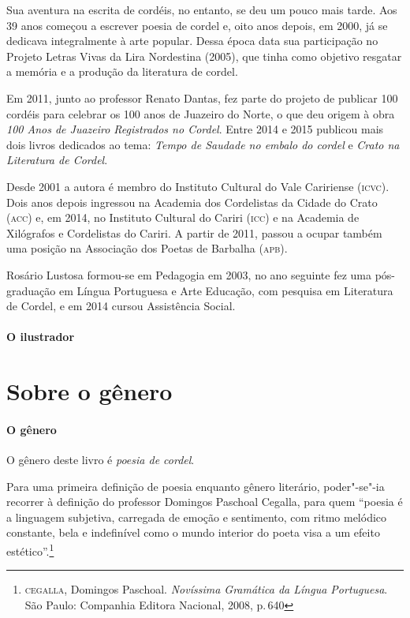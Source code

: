 \documentclass[11pt]{extarticle}
\begin{document}
Sua aventura na escrita de cordéis, no entanto, se deu um pouco mais tarde. Aos 39 anos começou a escrever poesia de cordel e, oito anos depois, em 2000, já se dedicava integralmente à arte popular. Dessa época data sua participação no Projeto Letras Vivas da Lira Nordestina (2005), que tinha como objetivo resgatar a memória e a produção da literatura de cordel.

Em 2011, junto ao professor Renato Dantas, fez parte do projeto de publicar 100 cordéis para celebrar os 100 anos de Juazeiro do Norte, o que deu origem à obra \textit{100 Anos de Juazeiro Registrados no Cordel}. Entre 2014 e 2015 publicou mais dois livros dedicados ao tema: \textit{Tempo de Saudade no embalo do cordel} e \textit{Crato na Literatura de Cordel}.

Desde 2001 a autora é membro do Instituto Cultural do Vale Caririense (\textsc{icvc}). Dois anos depois ingressou na Academia dos Cordelistas da Cidade do Crato (\textsc{acc}) e, em 2014, no Instituto Cultural do Cariri (\textsc{icc}) e na Academia de Xilógrafos e Cordelistas do Cariri. A partir de 2011, passou a ocupar também uma posição na Associação dos Poetas de Barbalha (\textsc{apb}).

Rosário Lustosa formou-se em Pedagogia em 2003, no ano seguinte fez uma pós-graduação em Língua Portuguesa e Arte Educação, com pesquisa em Literatura de Cordel, e em 2014 cursou Assistência Social.

\paragraph{O ilustrador}


\section{Sobre o gênero}

\paragraph{O gênero} O gênero deste livro é \textit{poesia de cordel}. 


Para uma primeira definição de poesia enquanto gênero literário, poder"-se"-ia recorrer à definição do professor Domingos Paschoal Cegalla, para quem ``poesia é a linguagem subjetiva, carregada de emoção e sentimento, com ritmo melódico constante, bela e indefinível como o mundo interior do poeta visa a um efeito estético''.\footnote{\textsc{cegalla}, Domingos Paschoal. \textit{Novíssima Gramática da Língua Portuguesa}. São Paulo: Companhia Editora Nacional, 2008, p.\,640}
\end{document}
